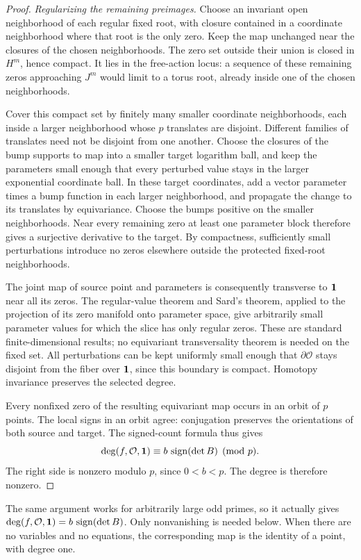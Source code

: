 \begin{proof}
\smallskip
\noindent\emph{Regularizing the remaining preimages.}
Choose an invariant open neighborhood of each regular fixed root, with closure contained in a coordinate neighborhood where that root is the only zero. Keep the map unchanged near the closures of the chosen neighborhoods. The zero set outside their union is closed in $H^m$, hence compact. It lies in the free-action locus: a sequence of these remaining zeros approaching $J^m$ would limit to a torus root, already inside one of the chosen neighborhoods.

Cover this compact set by finitely many smaller coordinate neighborhoods, each inside a larger neighborhood whose $p$ translates are disjoint. Different families of translates need not be disjoint from one another. Choose the closures of the bump supports to map into a smaller target logarithm ball, and keep the parameters small enough that every perturbed value stays in the larger exponential coordinate ball. In these target coordinates, add a vector parameter times a bump function in each larger neighborhood, and propagate the change to its translates by equivariance. Choose the bumps positive on the smaller neighborhoods. Near every remaining zero at least one parameter block therefore gives a surjective derivative to the target. By compactness, sufficiently small perturbations introduce no zeros elsewhere outside the protected fixed-root neighborhoods.

The joint map of source point and parameters is consequently transverse to $\mathbf 1$ near all its zeros. The regular-value theorem and Sard's theorem, applied to the projection of its zero manifold onto parameter space, give arbitrarily small parameter values for which the slice has only regular zeros. These are standard finite-dimensional results; no equivariant transversality theorem is needed on the fixed set. All perturbations can be kept uniformly small enough that $\partial\mathcal O$ stays disjoint from the fiber over $\mathbf 1$, since this boundary is compact. Homotopy invariance preserves the selected degree.

Every nonfixed zero of the resulting equivariant map occurs in an orbit of $p$ points. The local signs in an orbit agree: conjugation preserves the orientations of both source and target. The signed-count formula thus gives
\[
 \deg(f,\mathcal O,\mathbf 1)
 \equiv b\,\operatorname{sign}(\det B)\pmod p.
\]
The right side is nonzero modulo $p$, since $0<b<p$. The degree is therefore nonzero.
\end{proof}

\begin{remark}
The same argument works for arbitrarily large odd primes, so it actually gives
$\deg(f,\mathcal O,\mathbf 1)=b\,\operatorname{sign}(\det B)$.
Only nonvanishing is needed below. When there are no variables and no equations, the corresponding map is the identity of a point, with degree one.
\end{remark}
